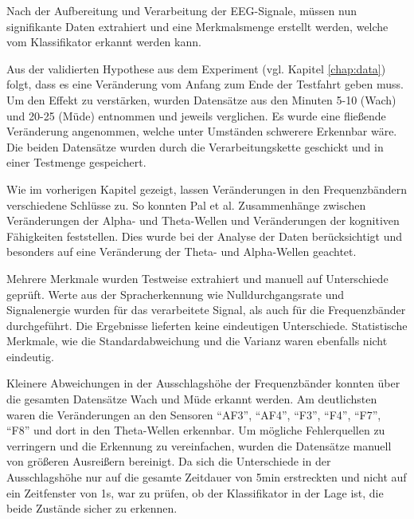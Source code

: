 \label{sec:extraction}
Nach der Aufbereitung und Verarbeitung der EEG-Signale, müssen nun signifikante Daten extrahiert und eine Merkmalsmenge erstellt werden, welche vom Klassifikator erkannt werden kann. 

Aus der validierten Hypothese aus dem Experiment (vgl. Kapitel \ref{chap:data}) folgt, dass es eine Veränderung vom Anfang zum Ende der Testfahrt geben muss. Um den Effekt zu verstärken, wurden Datensätze aus den Minuten 5-10 (Wach) und 20-25 (Müde) entnommen und jeweils verglichen. Es wurde eine fließende Veränderung angenommen, welche unter Umständen schwerere Erkennbar wäre. Die beiden Datensätze wurden durch die Verarbeitungskette geschickt und in einer Testmenge gespeichert. 

Wie im vorherigen Kapitel gezeigt, lassen Veränderungen in den Frequenzbändern verschiedene Schlüsse zu. So konnten Pal et al. \cite{Pal2008} Zusammenhänge zwischen Veränderungen der Alpha- und Theta-Wellen und Veränderungen der kognitiven Fähigkeiten feststellen. Dies wurde bei der Analyse der Daten berücksichtigt und besonders auf eine Veränderung der Theta- und Alpha-Wellen geachtet. 

Mehrere Merkmale wurden Testweise extrahiert und manuell auf Unterschiede geprüft. Werte aus der Spracherkennung wie Nulldurchgangsrate und Signalenergie wurden für das verarbeitete Signal, als auch für die Frequenzbänder durchgeführt. Die Ergebnisse lieferten keine eindeutigen Unterschiede. Statistische Merkmale, wie die Standardabweichung und die Varianz waren ebenfalls nicht eindeutig. 

Kleinere Abweichungen in der Ausschlagshöhe der Frequenzbänder konnten über die gesamten Datensätze Wach und Müde erkannt werden. Am deutlichsten waren die Veränderungen an den Sensoren "`AF3"', "`AF4"', "`F3"', "`F4"', "`F7"', "`F8"' und dort in den Theta-Wellen erkennbar. Um mögliche Fehlerquellen zu verringern und die Erkennung zu vereinfachen, wurden die Datensätze manuell von größeren Ausreißern bereinigt. Da sich die Unterschiede in der Ausschlagshöhe nur auf die gesamte Zeitdauer von 5min erstreckten und nicht auf ein Zeitfenster von 1s, war zu prüfen, ob der Klassifikator in der Lage ist, die beide Zustände sicher zu erkennen.